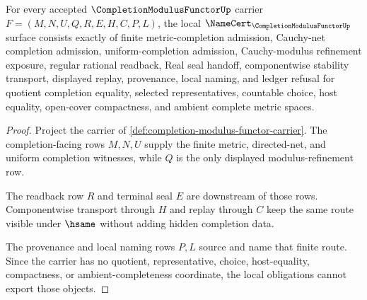 \begin{theorem}
\label{thm:completion-modulus-functor-namecert-obligations}
For every accepted $\CompletionModulusFunctorUp$ carrier $F=(M,N,U,Q,R,E,H,C,P,L)$, the local $\NameCert_{\CompletionModulusFunctorUp}$ surface consists exactly of finite metric-completion admission, Cauchy-net completion admission, uniform-completion admission, Cauchy-modulus refinement exposure, regular rational readback, Real seal handoff, componentwise stability transport, displayed replay, provenance, local naming, and ledger refusal for quotient completion equality, selected representatives, countable choice, host equality, open-cover compactness, and ambient complete metric spaces.
\end{theorem}
\begin{proof}
Project the carrier of \autoref{def:completion-modulus-functor-carrier}. The completion-facing rows $M,N,U$ supply the finite metric, directed-net, and uniform completion witnesses, while $Q$ is the only displayed modulus-refinement row.

The readback row $R$ and terminal seal $E$ are downstream of those rows. Componentwise transport through $H$ and replay through $C$ keep the same route visible under $\hsame$ without adding hidden completion data.

The provenance and local naming rows $P,L$ source and name that finite route. Since the carrier has no quotient, representative, choice, host-equality, compactness, or ambient-completeness coordinate, the local obligations cannot export those objects.
\end{proof}


